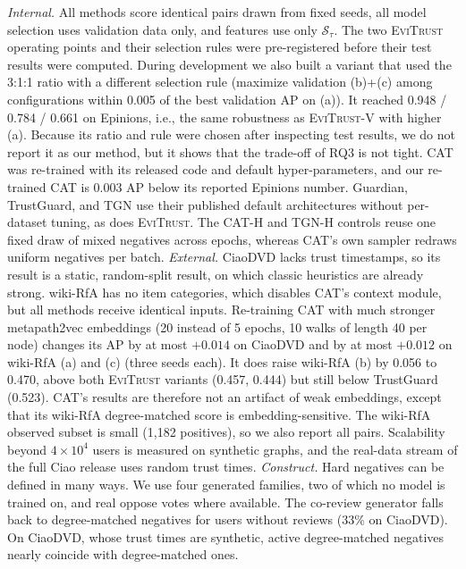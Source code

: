 \documentclass[conference]{IEEEtran}
\newcommand{\evi}{\textsc{EviTrust}}
\newcommand{\eviV}{\textsc{EviTrust}-V}
\begin{document}
\emph{Internal.} All methods score identical pairs drawn from fixed seeds, all model selection uses validation data only, and features use only $\mathcal{S}_\tau$. The two \evi{} operating points and their selection rules were pre-registered before their test results were computed. During development we also built a variant that used the 3:1:1 ratio with a different selection rule (maximize validation (b)+(c) among configurations within 0.005 of the best validation AP on (a)). It reached 0.948 / 0.784 / 0.661 on Epinions, i.e., the same robustness as \eviV{} with higher (a). Because its ratio and rule were chosen after inspecting test results, we do not report it as our method, but it shows that the trade-off of RQ3 is not tight. CAT was re-trained with its released code and default hyper-parameters, and our re-trained CAT is 0.003 AP below its reported Epinions number. Guardian, TrustGuard, and TGN use their published default architectures without per-dataset tuning, as does \evi{}. The CAT-H and TGN-H controls reuse one fixed draw of mixed negatives across epochs, whereas CAT's own sampler redraws uniform negatives per batch.
\emph{External.} CiaoDVD lacks trust timestamps, so its result is a static, random-split result, on which classic heuristics are already strong. wiki-RfA has no item categories, which disables CAT's context module, but all methods receive identical inputs. Re-training CAT with much stronger metapath2vec embeddings (20 instead of 5 epochs, 10 walks of length 40 per node) changes its AP by at most $+0.014$ on CiaoDVD and by at most $+0.012$ on wiki-RfA (a) and (c) (three seeds each). It does raise wiki-RfA (b) by 0.056 to 0.470, above both \evi{} variants (0.457, 0.444) but still below TrustGuard (0.523). CAT's results are therefore not an artifact of weak embeddings, except that its wiki-RfA degree-matched score is embedding-sensitive. The wiki-RfA observed subset is small (1{,}182 positives), so we also report all pairs. Scalability beyond $4\times10^4$ users is measured on synthetic graphs, and the real-data stream of the full Ciao release uses random trust times.
\emph{Construct.} Hard negatives can be defined in many ways. We use four generated families, two of which no model is trained on, and real oppose votes where available. The co-review generator falls back to degree-matched negatives for users without reviews (33\% on CiaoDVD). On CiaoDVD, whose trust times are synthetic, active degree-matched negatives nearly coincide with degree-matched ones.

\end{document}
